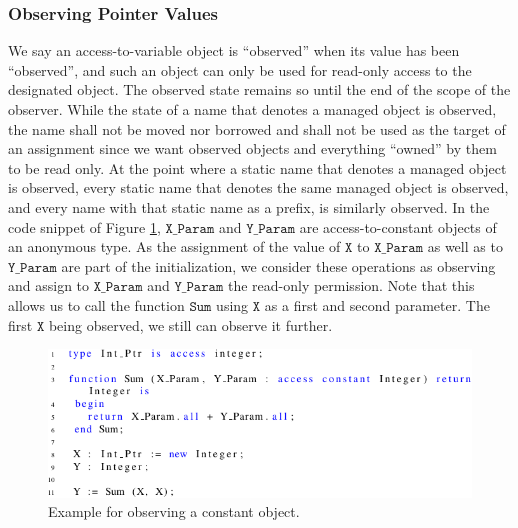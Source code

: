 \documentclass{llncs}
\newcommand\var[1]{\ensuremath{\mathtt{#1}}}
\begin{document}
\subsubsection{Observing Pointer Values}
\label{sec:observing}

We say an access-to-variable object is ``observed'' when its value has been ``observed'', and such an object can only be used for read-only access to the designated object.
The observed state remains so until the end of the scope of the observer. While the state of a name that denotes a managed object is observed, the name shall not be moved nor
borrowed and shall not be used as the target of an assignment since we want observed objects and everything ``owned'' by them to be read only. At the point where a static name
that denotes a managed object is observed, every static name that denotes the same managed object is observed, and every name with that static name as a prefix, is similarly observed. 
In the code snippet of Figure \ref{fig:observe_exp}, \var{X\_Param} and \var{Y\_Param} are access-to-constant objects of an anonymous type. As the assignment of the value of \var{X} to \var{X\_Param}
as well as to \var{Y\_Param} are part of the initialization, we consider these operations as observing and assign to \var{X\_Param} and \var{Y\_Param} the read-only permission. Note that
this allows us to call the function \var{Sum} using \var{X} as a first and second parameter. The first \var{X} being observed, we still can observe it further. 

\begin{figure}[htb!]
\centering
   \includegraphics[]{observe_ex1}
   \caption{Example for observing a constant object.}
   \label{fig:observe_exp}
\end{figure}
\end{document}
